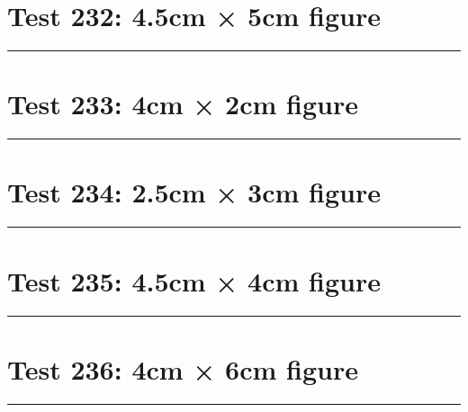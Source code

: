 \documentclass[a4paper,11pt]{article}
\begin{document}
\section*{Test 232: 4.5cm × 5cm figure}
\begin{swarmwrap}%
  \begin{minipage}[t]{4cm}
    \centering
    \rule{\linewidth}{5cm}
  \end{minipage}%
\end{swarmwrap}%
\swarmwrapnext
\lipsum[81]
\lipsum[82]
\lipsum[83]
\lipsum[84]
\section*{Test 233: 4cm × 2cm figure}
\begin{swarmwrap}%
  \begin{minipage}[t]{4cm}
    \centering
    \rule{\linewidth}{2cm}
  \end{minipage}%
\end{swarmwrap}%
\swarmwrapnext
\lipsum[25]
\lipsum[26]
\lipsum[27]
\lipsum[28]
\lipsum[29]
\lipsum[30]
\section*{Test 234: 2.5cm × 3cm figure}
\begin{swarmwrap}%
  \begin{minipage}[t]{2cm}
    \centering
    \rule{\linewidth}{3cm}
  \end{minipage}%
\end{swarmwrap}%
\swarmwrapnext
\lipsum[32]
\lipsum[33]
\lipsum[34]
\lipsum[35]
\lipsum[36]
\lipsum[37]
\section*{Test 235: 4.5cm × 4cm figure}
\begin{swarmwrap}%
  \begin{minipage}[t]{4cm}
    \centering
    \rule{\linewidth}{4cm}
  \end{minipage}%
\end{swarmwrap}%
\swarmwrapnext
\lipsum[76]
\lipsum[77]
\lipsum[78]
\lipsum[79]
\lipsum[80]
\lipsum[81]
\section*{Test 236: 4cm × 6cm figure}
\begin{swarmwrap}%
  \begin{minipage}[t]{4cm}
    \centering
    \rule{\linewidth}{6cm}
  \end{minipage}%
\end{swarmwrap}%
\swarmwrapnext
\lipsum[125]
\lipsum[126]
\lipsum[127]
\lipsum[128]
\lipsum[129]
\lipsum[130]
\end{document}
